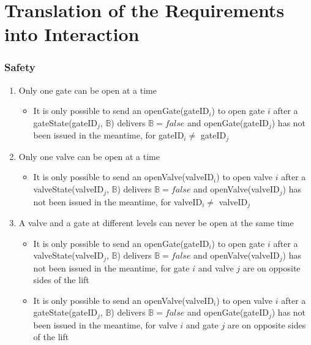 \section{Translation of the Requirements into Interaction}

\subsubsection*{Safety}
\begin{enumerate}
	\item Only one gate can be open at a time
		\begin{itemize}
			\item It is only possible to send an openGate(gateID$_i$) to open gate $i$ after a gateState(gateID$_j$, $ \mathbb{B} $) delivers $\mathbb{B} = false$ and openGate(gateID$_j$) has not been issued in the meantime, for gateID$_i \neq$ gateID$_j$
		\end{itemize}
	
	\item Only one valve can be open at a time
		\begin{itemize}
			\item It is only possible to send an openValve(valveID$_i$) to open valve $i$ after a valveState(valveID$_j$, $ \mathbb{B} $) delivers $\mathbb{B} = false$ and openValve(valveID$_j$) has not been issued in the meantime, for valveID$_i \neq$ valveID$_j$
		\end{itemize}
	
	\item A valve and a gate at different levels can never be open at the same time
		\begin{itemize}
			\item It is only possible to send an openGate(gateID$_i$) to open gate $i$ after a valveState(valveID$_j$, $ \mathbb{B} $) delivers $\mathbb{B} = false$ and openValve(valveID$_j$) has not been issued in the meantime, for gate $i$ and valve $j$ are on opposite sides of the lift 
			\item It is only possible to send an openValve(valveID$_i$) to open valve $i$ after a gateState(gateID$_j$, $ \mathbb{B} $) delivers $\mathbb{B} = false$ and openGate(gateID$_j$) has not been issued in the meantime, for valve $i$ and gate $j$ are on opposite sides of the lift
		\end{itemize}
	
	

\end{enumerate}
